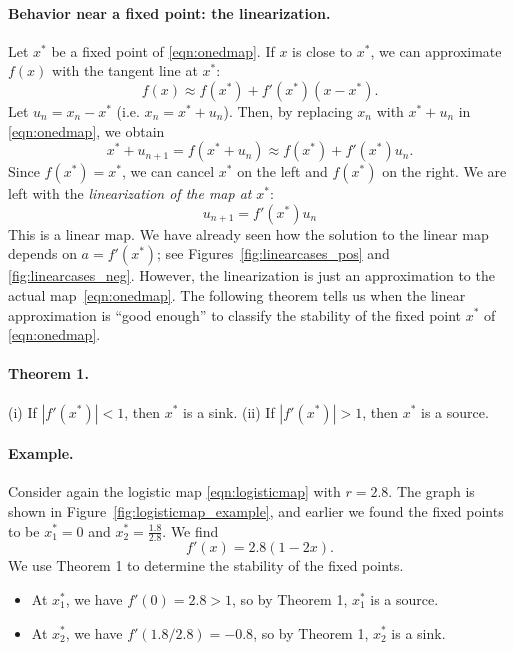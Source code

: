 \documentclass[reqno]{immbook}
\begin{document}
\paragraph{Behavior near a fixed point: the linearization.}
Let $x^*$ be a fixed point of \eqref{eqn:onedmap}.
If $x$ is close to $x^*$,
we can approximate $f(x)$ with the tangent line at $x^*$:
\begin{equation}
   f(x) \approx f(x^*) + f'(x^*)(x-x^*).
\end{equation}
Let $u_n = x_n-x^*$ (i.e. $x_n = x^* + u_n$).
Then, by replacing $x_n$ with $x^*+u_n$
in \eqref{eqn:onedmap}, we obtain
\begin{equation}
  x^* + u_{n+1} = f(x^*+u_n) \approx f(x^*)+f'(x^*)u_n.
\end{equation}
Since $f(x^*)=x^*$, we can cancel $x^*$ on the left
and $f(x^*)$ on the right.
We are left with the
\emph{linearization of the map at } $x^*$:
\begin{equation}
  u_{n+1} = f'(x^*)u_n
\end{equation}
This is a linear map.
We have already seen how the solution to the linear
map depends on $a=f'(x^*)$; see Figures~\ref{fig:linearcases_pos}
and \ref{fig:linearcases_neg}.
However, the linearization is just an approximation
to the actual map~\eqref{eqn:onedmap}.
The following theorem tells us when the linear approximation
is ``good enough'' to classify the stability of the
fixed point $x^*$ of \eqref{eqn:onedmap}.

\paragraph{Theorem 1.}
(i) If $|f'(x^*)| < 1$, then $x^*$ is a sink.
(ii) If $|f'(x^*)| > 1$, then $x^*$ is a source.


\paragraph{Example.}
Consider again the logistic map \eqref{eqn:logisticmap}
with $r=2.8$.  The graph is shown in
Figure~\ref{fig:logisticmap_example}, and earlier we found the
fixed points to be $x^*_1=0$ and $x^*_2=\frac{1.8}{2.8}$.
We find
\begin{equation}
  f'(x) = 2.8(1-2x).
\end{equation}
We use Theorem 1 to determine the stability of the fixed points.
\begin{itemize}
\item
At $x^*_1$, we have $f'(0) = 2.8 > 1$, so by Theorem 1,
$x^*_1$ is a source.
\item
At $x^*_2$, we have $f'(1.8/2.8) = -0.8$,
so by Theorem 1,
$x^*_2$ is a sink.
\end{itemize}
\end{document}
